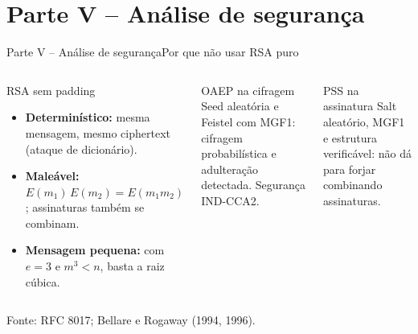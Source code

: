 \documentclass[10pt,aspectratio=169]{beamer}
\newcommand{\source}[1]{\vfill{\tiny\color{gray}Fonte: #1}}
\begin{document}
\section{Parte V -- Análise de segurança}
\begin{frame}{Parte V -- Análise de segurança}{Por que não usar RSA puro}
  \begin{columns}[T,onlytextwidth]
      \begin{alertblock}{RSA sem padding}
        \begin{itemize}
          \item \textbf{Determinístico:} mesma mensagem, mesmo ciphertext (ataque de dicionário).
          \item \textbf{Maleável:} $E(m_1)\,E(m_2) = E(m_1 m_2)$; assinaturas também se combinam.
          \item \textbf{Mensagem pequena:} com $e = 3$ e $m^3 < n$, basta a raiz cúbica.
        \end{itemize}
      \end{alertblock}
      \begin{block}{OAEP na cifragem}
        Seed aleatória e Feistel com MGF1: cifragem probabilística e adulteração detectada. Segurança IND-CCA2.
      \end{block}
      \begin{block}{PSS na assinatura}
        Salt aleatório, MGF1 e estrutura verificável: não dá para forjar combinando assinaturas.
      \end{block}
  \end{columns}
  \source{RFC 8017; Bellare e Rogaway (1994, 1996).}
\end{frame}
\end{document}
